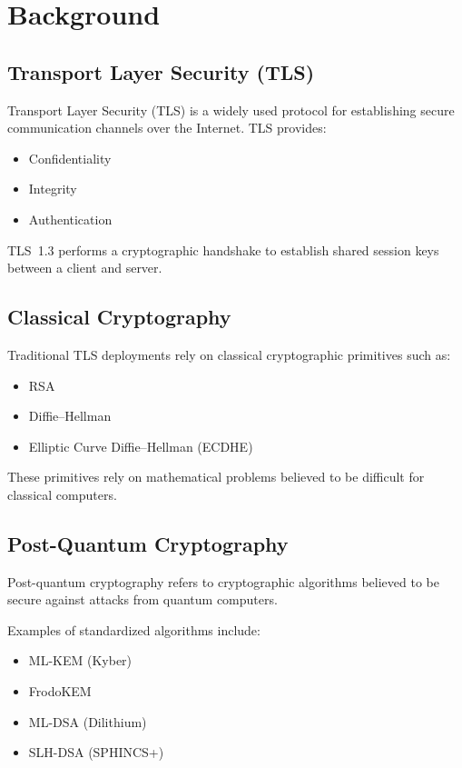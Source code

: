 \documentclass[11pt,a4paper]{article}
\begin{document}
\section{Background}

\subsection{Transport Layer Security (TLS)}

Transport Layer Security (TLS) is a widely used protocol for establishing secure communication channels over the Internet. TLS provides:

\begin{itemize}
\item Confidentiality
\item Integrity
\item Authentication
\end{itemize}

TLS~1.3 performs a cryptographic handshake to establish shared session keys between a client and server.

\subsection{Classical Cryptography}

Traditional TLS deployments rely on classical cryptographic primitives such as:

\begin{itemize}
\item RSA
\item Diffie--Hellman
\item Elliptic Curve Diffie--Hellman (ECDHE)
\end{itemize}

These primitives rely on mathematical problems believed to be difficult for classical computers.

\subsection{Post-Quantum Cryptography}

Post-quantum cryptography refers to cryptographic algorithms believed to be secure against attacks from quantum computers.

Examples of standardized algorithms include:

\begin{itemize}
\item ML-KEM (Kyber)
\item FrodoKEM
\item ML-DSA (Dilithium)
\item SLH-DSA (SPHINCS+)
\end{itemize}
\end{document}
